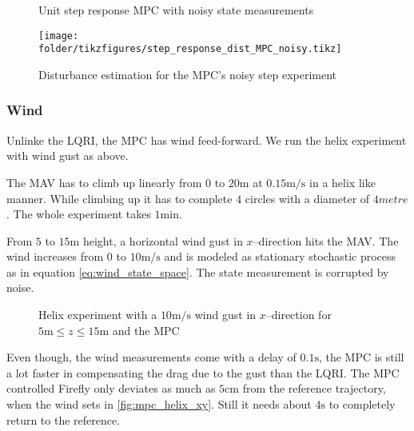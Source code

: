 \begin{figure}
\centering
{}
\qquad
{}
\caption{Unit step response MPC with noisy state measurements}
\label{fig:mpc_step_noisy}
\end{figure}

\begin{figure}
\centering
\texttt{[image: \\folder/tikzfigures/step\_response\_dist\_MPC\_noisy.tikz]}
\label{fig:mpc_step_dist_noisy}
\caption{Disturbance estimation for the MPC's noisy step experiment}
\end{figure}

\subsubsection{Wind}
Unlinke the LQRI, the MPC has wind feed-forward. We run the helix experiment with wind gust as above.

The MAV has to climb up linearly from $0$ to $20 \si{\metre}$ at $0.15 \si{\metre\per\second}$ in a helix like manner. While climbing up it has to complete $4$ circles with a diameter of $4\si{metre}$. The whole experiment takes $1 \si{\minute}$. 

From $5$ to $15 \si{\metre}$ height, a horizontal wind gust in $x$--direction hits the MAV. The wind increases from $0$ to $10 \si{\metre\per\second}$ and is modeled as stationary stochastic process as in equation \ref{eq:wind_state_space}. The state measurement is corrupted by noise.

\begin{figure}
\centering
{}
\qquad
{}
\caption{Helix experiment with a $10 \si{\metre\per\second}$ wind gust in $x$--direction for $5 \si{\metre} \leq z \leq 15 \si{\metre}$ and the MPC}
\label{fig:mpc_helix}
\end{figure}

Even though, the wind measurements come with a delay of $0.1 \si{\second}$, the MPC is still a lot faster in compensating the drag due to the gust than the LQRI. The MPC controlled Firefly only deviates as much as $5\si{\centi\metre}$ from the reference trajectory, when the wind sets in \ref{fig:mpc_helix_xy}. Still it needs about $4\si{\second}$ to completely return to the reference.
